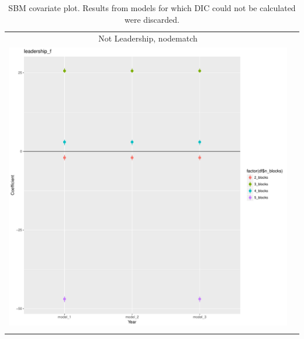 \documentclass[fleqn,12pt]{wlscirep}
\begin{document}
\clearpage
\begin{longtable}[!h]{c@{\hskip 0cm}c}
Not Leadership, nodematch \\
\includegraphics[height=.75\textheight, clip=true, trim=.5cm .5cm 0cm .6cm]{figures/rl_plots1/leadership_f.pdf}   \\
\caption{\label{fig:SBM_plot_com} SBM covariate plot. Results from models for which DIC could not be calculated were discarded.}
\end{longtable}
\end{document}

